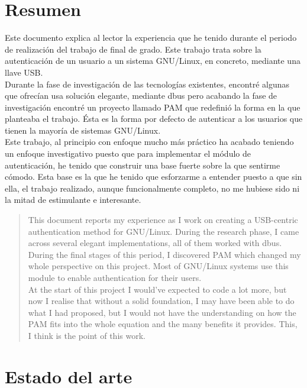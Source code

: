 \documentclass[titlepage, 12pt, a4paper]{article}
\begin{document}
\section{Resumen}
Este documento explica al lector la experiencia que he tenido durante el periodo de realización del trabajo de final de grado. Este trabajo trata sobre la autenticación de un usuario a un sistema \Gls{GNU/Linux}, en concreto, mediante una llave \Gls{USB}.\\Durante la fase de investigación de las tecnologías existentes, encontré algunas que ofrecían usa solución elegante, mediante \Gls{dbus} pero acabando la fase de investigación encontré un proyecto llamado \Gls{PAM} que redefinió la forma en la que planteaba el trabajo. Ésta es la forma por defecto de autenticar a los usuarios que tienen la mayoría de sistemas \Gls{GNU/Linux}.\\Este trabajo, al principio con enfoque mucho más práctico ha acabado teniendo un enfoque investigativo puesto que para implementar el módulo de autenticación, he tenido que construir una base fuerte sobre la que sentirme cómodo. Esta base es la que he tenido que esforzarme a entender puesto a que sin ella, el trabajo realizado, aunque funcionalmente completo, no me hubiese sido ni la mitad de estimulante e interesante.
\begin{abstract}
	This document reports my experience as I work on creating a USB-centric authentication method for \Gls{GNU/Linux}. During the research phase, I came across several elegant implementations, all of them worked with \Gls{dbus}. During the final stages of this period, I discovered \Gls{PAM} which changed my whole perspective on this project. Most of \Gls{GNU/Linux} systems use this module to enable authentication for their users.\\At the start of this project I would've expected to code a lot more, but now I realise that without a solid foundation, I may have been able to do what I had proposed, but I would not have the understanding on how the \Gls{PAM} fits into the whole equation and the many benefits it provides. This, I think is the point of this work.
\end{abstract}
\clearpage
\listoffigures
\clearpage
\printglossary[title={Abreviaciones y tecnicismos}]
\clearpage
\section{Estado del arte}
\end{document}
